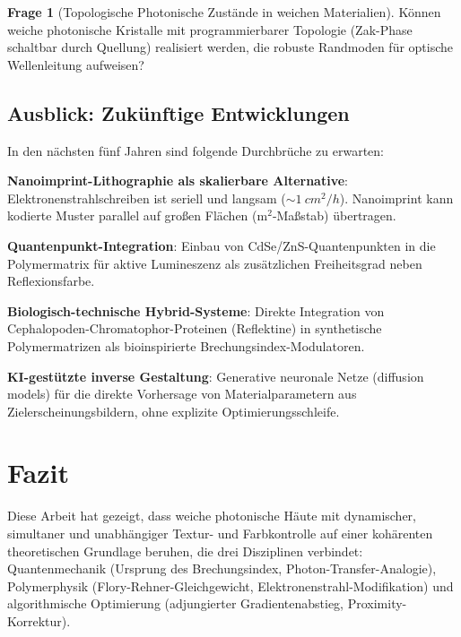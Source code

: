 ﻿\documentclass[a4paper,12pt]{article}
\theoremstyle{definition}
\newtheorem{frage}{Frage}[section]
\begin{document}
	\begin{frage}[Topologische Photonische Zustände in weichen Materialien]
		Können weiche photonische Kristalle mit programmierbarer
		Topologie (Zak-Phase schaltbar durch Quellung) realisiert werden,
		die robuste Randmoden für optische Wellenleitung aufweisen?
	\end{frage}
	
	\subsection{Ausblick: Zukünftige Entwicklungen}
	
	In den nächsten fünf Jahren sind folgende Durchbrüche zu erwarten:
	
	\textbf{Nanoimprint-Lithographie als skalierbare Alternative}:
	Elektronenstrahlschreiben ist seriell und langsam ($\sim \SI{1}{cm^2/h}$).
	Nanoimprint kann kodierte Muster parallel auf großen Flächen
	($\mathrm{m}^2$-Maßstab) übertragen.
	
	\textbf{Quantenpunkt-Integration}:
	Einbau von CdSe/ZnS-Quantenpunkten in die Polymermatrix für
	aktive Lumineszenz als zusätzlichen Freiheitsgrad neben Reflexionsfarbe.
	
	\textbf{Biologisch-technische Hybrid-Systeme}:
	Direkte Integration von Cephalopoden-Chromatophor-Proteinen
	(Reflektine) in synthetische Polymermatrizen als bioinspirierte
	Brechungsindex-Modulatoren.
	
	\textbf{KI-gestützte inverse Gestaltung}:
	Generative neuronale Netze (diffusion models) für die direkte
	Vorhersage von Materialparametern aus Zielerscheinungsbildern,
	ohne explizite Optimierungsschleife.
	
	\section{Fazit}
	\label{sec:fazit}
	
	Diese Arbeit hat gezeigt, dass weiche photonische Häute mit dynamischer,
	simultaner und unabhängiger Textur- und Farbkontrolle auf einer kohärenten
	theoretischen Grundlage beruhen, die drei Disziplinen verbindet:
	Quantenmechanik (Ursprung des Brechungsindex, Photon-Transfer-Analogie),
	Polymerphysik (Flory-Rehner-Gleichgewicht, Elektronenstrahl-Modifikation)
	und algorithmische Optimierung (adjungierter Gradientenabstieg,
	Proximity-Korrektur).
	
\end{document}

